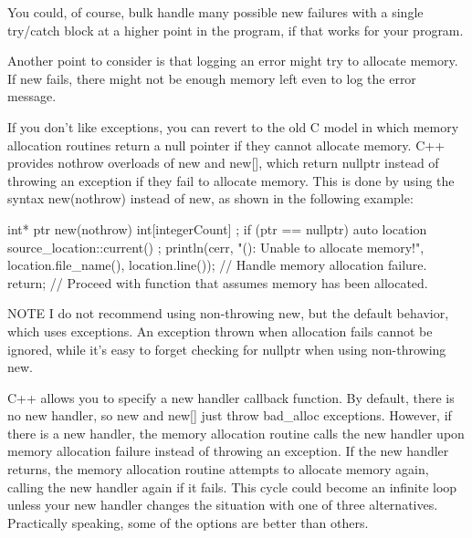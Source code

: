 You could, of course, bulk handle many possible new failures with a single try/catch block at a higher point in the program, if that works for your program.

Another point to consider is that logging an error might try to allocate memory. If new fails, there might not be enough memory left even to log the error message.


If you don’t like exceptions, you can revert to the old C model in which memory allocation routines return a null pointer if they cannot allocate memory. C++ provides nothrow overloads of new and new[], which return nullptr instead of throwing an exception if they fail to allocate memory. This is done by using the syntax new(nothrow) instead of new, as shown in the following example:

\begin{cpp}
int* ptr { new(nothrow) int[integerCount] };
if (ptr == nullptr) {
    auto location { source_location::current() };
    println(cerr, "{}({}): Unable to allocate memory!",
        location.file_name(), location.line());
    // Handle memory allocation failure.
    return;
}
// Proceed with function that assumes memory has been allocated.
\end{cpp}

\begin{myNotic}{NOTE}
I do not recommend using non-throwing new, but the default behavior, which uses exceptions. An exception thrown when allocation fails cannot be ignored, while it’s easy to forget checking for nullptr when using non-throwing new.
\end{myNotic}


C++ allows you to specify a new handler callback function. By default, there is no new handler, so new and new[] just throw bad\_alloc exceptions. However, if there is a new handler, the memory allocation routine calls the new handler upon memory allocation failure instead of throwing an exception. If the new handler returns, the memory allocation routine attempts to allocate memory again, calling the new handler again if it fails. This cycle could become an infinite loop unless your new handler changes the situation with one of three alternatives. Practically speaking, some of the options are better than others.

